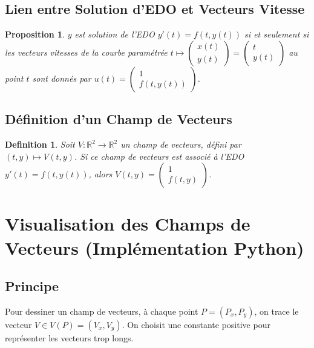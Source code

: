 \documentclass{article}
\newtheorem{proposition}[theorem]{Proposition}
\newtheorem{definition}{Definition}
\begin{document}
\subsection{Lien entre Solution d'EDO et Vecteurs Vitesse}

\begin{proposition}
$y$ est solution de l'EDO $y'(t) = f(t, y(t))$ si et seulement si les vecteurs vitesses de la courbe paramétrée $t \mapsto \begin{pmatrix} x(t) \\ y(t) \end{pmatrix} = \begin{pmatrix} t \\ y(t) \end{pmatrix}$ au point $t$ sont donnés par $u(t) = \begin{pmatrix} 1 \\ f(t, y(t)) \end{pmatrix}$.
\end{proposition}

\subsection{Définition d'un Champ de Vecteurs}

\begin{definition}
Soit $V : \mathbb{R}^2 \rightarrow \mathbb{R}^2$ un champ de vecteurs, défini par $(t, y) \mapsto V(t, y)$.
Si ce champ de vecteurs est associé à l'EDO $y'(t) = f(t, y(t))$, alors $V(t, y) = \begin{pmatrix} 1 \\ f(t, y) \end{pmatrix}$.
\end{definition}

\section{Visualisation des Champs de Vecteurs (Implémentation Python)}

\subsection{Principe}

Pour dessiner un champ de vecteurs, à chaque point $P = (P_x, P_y)$, on trace le vecteur $V \in V(P) = (V_x, V_y)$. On choisit une constante positive pour représenter les vecteurs trop longs.
\end{document}

